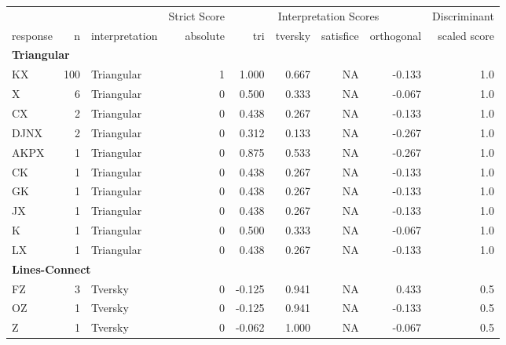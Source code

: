 \documentclass[
  letterpaper,
  DIV=11,
  numbers=noendperiod]{scrreprt}
\begin{document}
\begin{tabular}[t]{l|r|l|r|r|r|r|r|r}
\hline
\multicolumn{3}{c|}{ } & \multicolumn{1}{c|}{Strict Score} & \multicolumn{4}{c|}{Interpretation Scores} & \multicolumn{1}{c}{Discriminant} \\
\cline{4-4} \cline{5-8} \cline{9-9}
response & n & interpretation & absolute & tri & tversky & satisfice & orthogonal & scaled score\\
\hline
\multicolumn{9}{l}{\textbf{Triangular}}\\
\hline
\hspace{1em}KX & 100 & Triangular & 1 & 1.000 & 0.667 & NA & -0.133 & 1.0\\
\hline
\hspace{1em}X & 6 & Triangular & 0 & 0.500 & 0.333 & NA & -0.067 & 1.0\\
\hline
\hspace{1em}CX & 2 & Triangular & 0 & 0.438 & 0.267 & NA & -0.133 & 1.0\\
\hline
\hspace{1em}DJNX & 2 & Triangular & 0 & 0.312 & 0.133 & NA & -0.267 & 1.0\\
\hline
\hspace{1em}AKPX & 1 & Triangular & 0 & 0.875 & 0.533 & NA & -0.267 & 1.0\\
\hline
\hspace{1em}CK & 1 & Triangular & 0 & 0.438 & 0.267 & NA & -0.133 & 1.0\\
\hline
\hspace{1em}GK & 1 & Triangular & 0 & 0.438 & 0.267 & NA & -0.133 & 1.0\\
\hline
\hspace{1em}JX & 1 & Triangular & 0 & 0.438 & 0.267 & NA & -0.133 & 1.0\\
\hline
\hspace{1em}K & 1 & Triangular & 0 & 0.500 & 0.333 & NA & -0.067 & 1.0\\
\hline
\hspace{1em}LX & 1 & Triangular & 0 & 0.438 & 0.267 & NA & -0.133 & 1.0\\
\hline
\multicolumn{9}{l}{\textbf{Lines-Connect}}\\
\hline
\hspace{1em}FZ & 3 & Tversky & 0 & -0.125 & 0.941 & NA & 0.433 & 0.5\\
\hline
\hspace{1em}OZ & 1 & Tversky & 0 & -0.125 & 0.941 & NA & -0.133 & 0.5\\
\hline
\hspace{1em}Z & 1 & Tversky & 0 & -0.062 & 1.000 & NA & -0.067 & 0.5\\

\end{tabular}
\end{document}
